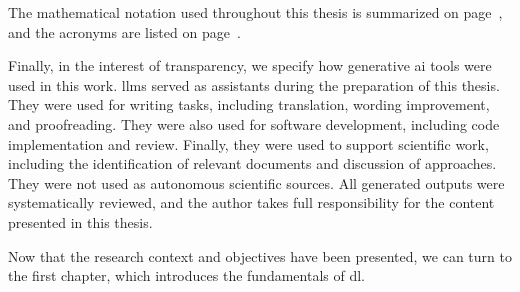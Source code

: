 The mathematical notation used throughout this thesis is summarized on page~\pageref{chap:notation}, and the acronyms are listed on page~\pageref{chap:acronyms}.

Finally, in the interest of transparency, we specify how generative \gls{ai} tools were used in this work.
\Glspl{llm} served as assistants during the preparation of this thesis.
They were used for writing tasks, including translation, wording improvement, and proofreading.
They were also used for software development, including code implementation and review.
Finally, they were used to support scientific work, including the identification of relevant documents and discussion of approaches.
They were not used as autonomous scientific sources.
All generated outputs were systematically reviewed, and the author takes full responsibility for the content presented in this thesis.

Now that the research context and objectives have been presented, we can turn to the first chapter, which introduces the fundamentals of \gls{dl}.